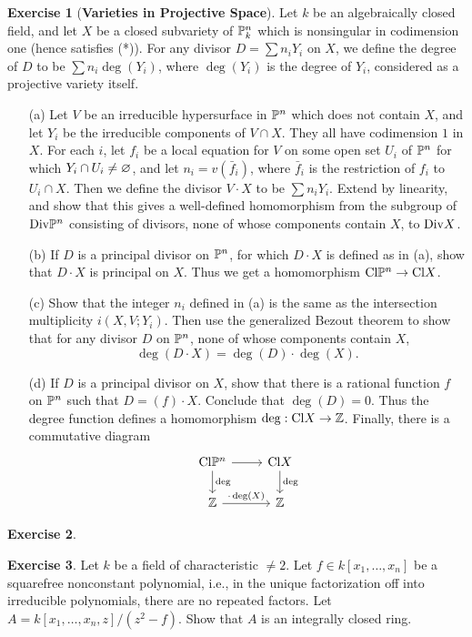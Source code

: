 \documentclass[11pt]{book}
\theoremstyle{definition}
\newtheorem{exercise}{Exercise}[section]
\begin{document}
\begin{exercise}[\textbf{Varieties in Projective Space}]
Let $k$ be an algebraically closed field, and let $X$ be a closed subvariety of $\P^n_k$ which is nonsingular in codimension one (hence satisfies (*)). For any divisor $D=\sum n_iY_i$ on $X$, we define the degree of $D$ to be $\sum n_i\deg(Y_i)$, where $\deg(Y_i)$ is the degree of $Y_i$, considered as a projective variety itself.
\begin{itemize}
\item[(a)] Let $V$ be an irreducible hypersurface in $\P^n$ which does not contain $X$, and let $Y_i$ be the irreducible components of $V\cap X$. They all have codimension $1$ in $X$. For each $i$, let $f_i$ be a local equation for $V$ on some open set $U_i$ of $\P^n$ for which $Y_i\cap U_i\neq\emp$, and let $n_i=v(\bar{f}_i)$, where $\bar{f}_i$ is the restriction of $f_i$ to $U_i\cap X$. Then we define the divisor $V\cdot X$ to be $\sum n_iY_i$. Extend by linearity, and show that this gives a well-defined homomorphism from the subgroup of $\Div\P^n$ consisting of divisors, none of whose components contain $X$, to $\Div X$.
\item[(b)] If $D$ is a principal divisor on $\P^n$, for which $D\cdot X$ is defined as in (a), show that $D\cdot X$ is principal on $X$. Thus we get a homomorphism $\Cl\P^n\to\Cl X$.
\item[(c)] Show that the integer $n_i$ defined in (a) is the same as the intersection multiplicity $i(X,V;Y_i)$. Then use the generalized Bezout theorem to show that for any divisor $D$ on $\P^n$, none of whose components contain $X$,
\[\deg(D\cdot X)=\deg(D)\cdot\deg(X).\] 
\item[(d)] If $D$ is a principal divisor on $X$, show that there is a rational function $f$ on $\P^n$ such that $D=(f)\cdot X$. Conclude that $\deg(D)=0$. Thus the degree function defines a homomorphism $\deg:\Cl X\to\Z$. Finally, there is a commutative diagram
\[\begin{tikzcd}
\Cl\P^n\ar[r]\ar[d,"\deg"]&\Cl X\ar[d,"\deg"]\\
\Z\ar[r,"\cdot\deg(X)"]&\Z
\end{tikzcd}\]
\end{itemize}
\end{exercise}
\begin{exercise}

\end{exercise}
\begin{exercise}
Let $k$ be a field of characteristic $\neq 2$. Let $f\in k[x_1,\dots,x_n]$ be a squarefree nonconstant polynomial, i.e., in the unique factorization off into irreducible polynomials, there are no repeated factors. Let $A=k[x_1,\dots,x_n,z]/(z^2-f)$. Show that $A$ is an integrally closed ring.
\end{exercise}
\end{document}
